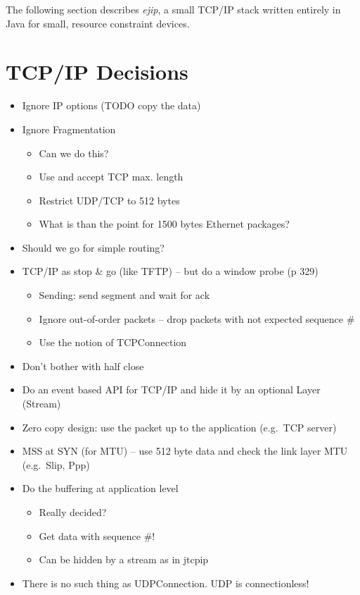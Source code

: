 The following section describes \emph{ejip}, a small TCP/IP stack
written entirely in Java for small, resource constraint devices.

%

\section{TCP/IP Decisions}

\begin{itemize}
    \item Ignore IP options (TODO copy the data)
    \item Ignore Fragmentation
    \begin{itemize}
        \item Can we do this?
        \item Use and accept TCP max. length
        \item Restrict UDP/TCP to 512 bytes
        \item What is than the point for 1500 bytes Ethernet
        packages?
    \end{itemize}
    \item Should we go for simple routing?
    \item TCP/IP as stop \& go (like TFTP) -- but do a window probe
    (p 329)
    \begin{itemize}
        \item Sending: send segment and wait for ack
        \item Ignore out-of-order packets -- drop packets with not
        expected sequence \#
        \item Use the notion of TCPConnection
    \end{itemize}
    \item Don't bother with half close
    \item Do an event based API for TCP/IP and hide it by an
    optional Layer (Stream)
    \item Zero copy design: use the packet up to the application
    (e.g.\ TCP server)
    \item MSS at SYN (for MTU) -- use 512 byte data and check the
    link layer MTU (e.g.\ Slip, Ppp)
    \item Do the buffering at application level
    \begin{itemize}
        \item Really decided?
        \item Get data with sequence \#!
        \item Can be hidden by a stream as in jtcpip
    \end{itemize}
    \item There is no such thing as UDPConnection. UDP is
    connectionless!
\end{itemize}
